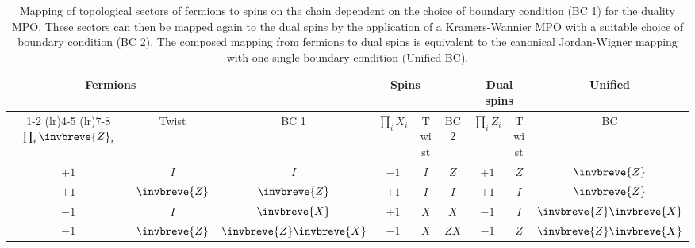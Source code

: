 \begin{table}[htbp]
    \centering
    \setlength{\tabcolsep}{6pt}
    \renewcommand{\arraystretch}{1.3}
    \begin{tabular}{@{}cc c cc c cc c@{}}
    \toprule
    \multicolumn{2}{c}{Fermions} & & \multicolumn{2}{c}{Spins} & & \multicolumn{2}{c}{Dual spins} & Unified \\
    \cmidrule(lr){1-2} \cmidrule(lr){4-5} \cmidrule(lr){7-8}
    $\prod_i \invbreve{Z}_i$ & Twist & BC 1 & $\prod_i X_i$ & Twist & BC 2 & $\prod_i Z_i$ & Twist & BC \\
    \midrule
    $+1$ & $I$ & $I$ & $-1$ & $I$ & $Z$ & $+1$ & $Z$ & $\invbreve{Z}$ \\
    $+1$ & $\invbreve{Z}$ & $\invbreve{Z}$ & $+1$ & $I$ & $I$ & $+1$ & $I$ & $\invbreve{Z}$ \\
    $-1$ & $I$ & $\invbreve{X}$ & $+1$ & $X$ & $X$ & $-1$ & $I$ & $\invbreve{Z}\invbreve{X}$ \\
    $-1$ & $\invbreve{Z}$ & $\invbreve{Z}\invbreve{X}$ & $-1$ & $X$ & $ZX$ & $-1$ & $Z$ & $\invbreve{Z}\invbreve{X}$ \\
    \bottomrule
    \end{tabular}
    \caption{Mapping of topological sectors of fermions to spins on the chain dependent on the choice of boundary condition (BC 1) for the duality MPO. These sectors can then be mapped again to the dual spins by the application of a Kramers-Wannier MPO with a suitable choice of boundary condition (BC 2). The composed mapping from fermions to dual spins is equivalent to the canonical Jordan-Wigner mapping with one single boundary condition (Unified BC). \label{tab:cycle_mapping}}
\end{table}

